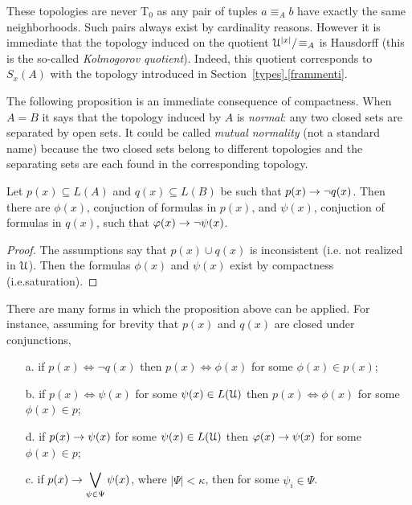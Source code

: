 \documentclass[creche.tex]{subfiles}
\begin{document}
These topologies are never T$_0$ as any pair of tuples $a\equiv_A b$ have exactly the same neighborhoods. Such pairs always exist by cardinality reasons. However it is immediate that the topology induced on the quotient $\EuScript U^{|x|}/\!\equiv_A$ is Hausdorff (this is the so-called \textit{Kolmogorov quotient}). Indeed, this quotient corresponds to $S_x(A)$ with the topology introduced in Section~\hyperref[frammenti]{\ref{types}.\ref*{frammenti}}.

The following proposition is an immediate consequence of compactness. When $A=B$ it says that the topology induced by $A$ is \textit{normal}: any two closed sets are separated by open sets. It could be called \emph{mutual normality\/} (not a standard name) because the two closed sets belong to different topologies and the separating sets are each found in the corresponding topology.


\begin{proposition}\label{prop_normality}
Let $p(x)\subseteq L(A)$ and $q(x)\subseteq L(B)$ be such that $p(x)\rightarrow \neg q(x)$. Then there are $\phi(x)$, conjuction of formulas in $p(x)$, and $\psi(x)$, conjuction of formulas in $q(x)$, such that $\varphi(x)\rightarrow\neg\psi(x)$.
\end{proposition}

\begin{proof}
The assumptions say that $p(x)\cup q(x)$ is inconsistent (i.e. not realized in $\EuScript U$). Then the formulas $\phi(x)$ and $\psi(x)$ exist by compactness (i.e.\@ saturation).
\end{proof}

\begin{remark}\label{rem_normality}There are many forms in which the proposition above can be applied. For instance, assuming for brevity that $p(x)$ and $q(x)$ are closed under conjunctions,
\begin{itemize}
\item[a.] if $p(x)\iff\neg q(x)$ then $p(x)\iff\phi(x)$ for some $\phi(x)\in p(x)$;\smallskip
\item[b.] if $\displaystyle p(x)\iff\psi(x)$ for some $\psi(x)\in L(\EuScript U)$ then $p(x)\iff\phi(x)$ for some $\phi(x)\in p$;\smallskip
\item[d.] if $\displaystyle p(x)\rightarrow\psi(x)$ for some $\psi(x)\in L(\EuScript U)$ then $\varphi(x)\rightarrow\psi(x)$ for some $\phi(x)\in p$;\smallskip
\item[c.] if $\displaystyle p(x)\rightarrow\bigvee_{\psi\in\Psi}\psi(x)$, where $|\Psi|<\kappa$,  then  for some $\psi_i\in\Psi$.\QED
\end{itemize}
\end{remark}
\end{document}
